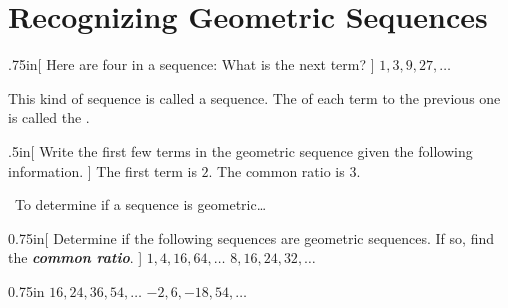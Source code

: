 \section{Recognizing Geometric Sequences}

\begin{myWideProblem}{.75in}[%
    Here are four  in a sequence:
    What is the next term?
    ]
    {
        \(
            1, 3, 9, 27, \dots
        \)
    }
\end{myWideProblem}

This kind of sequence is called a  sequence.
The  of each term to the previous one is called the .


\begin{myWideProblem}{.5in}[
        Write the first few terms in the geometric sequence given the following information.
    ]
    {
        The first term is $2$. The common ratio is $3$.
    }
    \end{myWideProblem}
    
\begin{myConceptSteps}{~To determine if a sequence is geometric\dots}
\end{myConceptSteps}

%

\begin{my2Problems}{0.75in}[%
        Determine if the following sequences are geometric sequences.
        If so, find the {\bfseries\itshape common ratio}.
    ]
    {
        $1, 4, 16, 64, \dots$
    }
    {
        $8, 16, 24, 32, \dots$
    }
\end{my2Problems}
\begin{my2Problems}{0.75in}
    {
        $16, 24, 36, 54, \dots$
    }
    {
        $-2, 6, -18, 54, \dots$
    }
\end{my2Problems}
